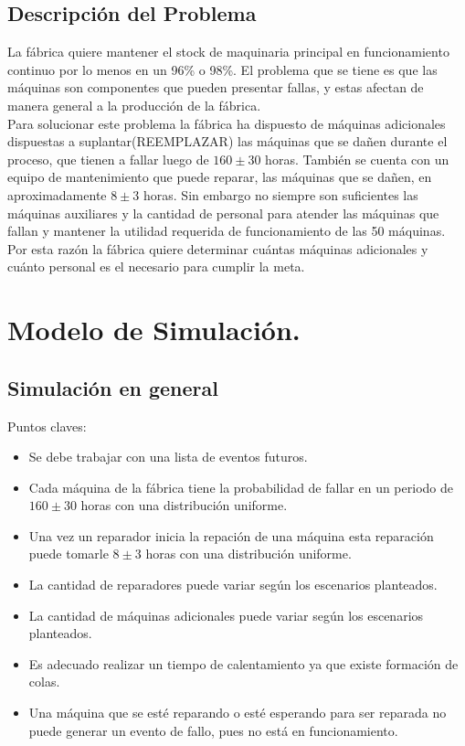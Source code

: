 \documentclass[10pt]{article}
\begin{document}
\subsection{Descripción del Problema}

La fábrica quiere mantener el stock de maquinaria principal en funcionamiento continuo por lo menos en un 96\% o 98\%. El problema que se tiene es que las máquinas son componentes que pueden presentar fallas, y estas afectan de manera general a la producción de la fábrica.\\

Para solucionar este problema la fábrica ha dispuesto de máquinas adicionales dispuestas a suplantar(REEMPLAZAR) las máquinas que se dañen durante el proceso, que tienen a fallar luego de $160\pm30$ horas. También se cuenta con un equipo de mantenimiento que puede reparar, las máquinas que se dañen, en aproximadamente $8\pm3$ horas. Sin embargo no siempre son suficientes las máquinas auxiliares y la cantidad de personal para atender las máquinas que fallan y mantener la utilidad requerida de funcionamiento de las 50 máquinas. Por esta razón la fábrica quiere determinar cuántas máquinas adicionales y cuánto personal es el necesario para cumplir la meta.

\section{Modelo de Simulación.}

\subsection{Simulación en general}

Puntos claves:
\begin{itemize}
\item Se debe trabajar con una lista de eventos futuros.
\item Cada máquina de la fábrica tiene la probabilidad de fallar en un periodo de $160\pm30$ horas con una distribución uniforme.
\item Una vez un reparador inicia la repación de una máquina esta reparación puede tomarle $8\pm3$ horas con una distribución uniforme.
\item La cantidad de reparadores puede variar según los escenarios planteados.
\item La cantidad de máquinas adicionales puede variar según los escenarios planteados.
\item Es adecuado realizar un tiempo de calentamiento ya que existe formación de colas.
\item Una máquina que se esté reparando o esté esperando para ser reparada no puede generar un evento de fallo, pues no está en funcionamiento. 
\end{itemize}
\end{document}
